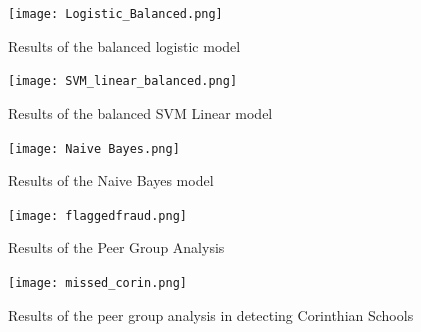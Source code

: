 \documentclass[10pt,twocolumn]{article}
\begin{document}
\begin{figure}[!t]
  \begin{center}
    \texttt{[image: Logistic\_Balanced.png]}
  \end{center}

  \caption{\Figure Results of the balanced logistic model}
  \label{log_balanced}
\end{figure}

\begin{figure}[!t]
  \begin{center}
    \texttt{[image: SVM\_linear\_balanced.png]}
  \end{center}

  \caption{\Figure Results of the balanced SVM Linear model}
  \label{SVM_balanced}
\end{figure}

\begin{figure}[!t]
  \begin{center}
    \texttt{[image: Naive Bayes.png]}
  \end{center}

  \caption{\Figure Results of the Naive Bayes model}
  \label{naive_bayes}
\end{figure}

\begin{figure}[!t]
  \begin{center}
    \texttt{[image: flaggedfraud.png]}
  \end{center}

  \caption{\Figure Results of the Peer Group Analysis}
  \label{peer_group}
\end{figure}

\begin{figure}[!t]
  \begin{center}
    \texttt{[image: missed\_corin.png]}
  \end{center}

  \caption{\Figure Results of the peer group analysis in detecting Corinthian Schools}
  \label{peer_group2}
\end{figure}
\end{document}
